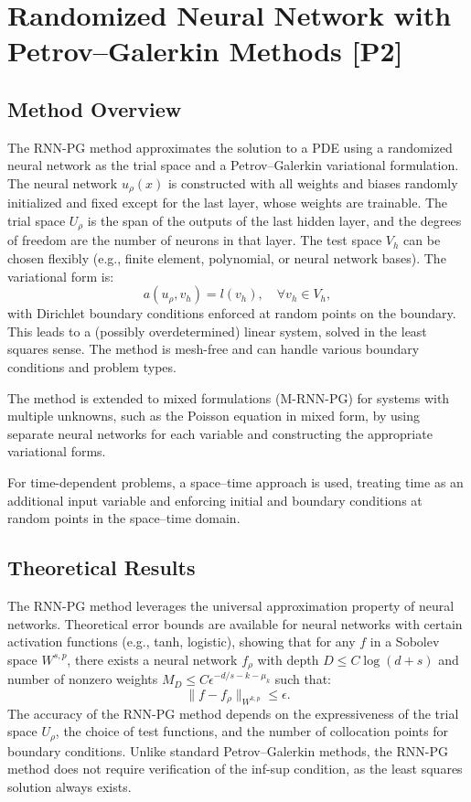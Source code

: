\documentclass[12pt]{article}
\begin{document}
\section{Randomized Neural Network with Petrov–Galerkin Methods [P2]}
\subsection{Method Overview}
The RNN-PG method approximates the solution to a PDE using a randomized neural network as the trial space and a Petrov–Galerkin variational formulation. The neural network $u_\rho(x)$ is constructed with all weights and biases randomly initialized and fixed except for the last layer, whose weights are trainable. The trial space $U_\rho$ is the span of the outputs of the last hidden layer, and the degrees of freedom are the number of neurons in that layer. The test space $V_h$ can be chosen flexibly (e.g., finite element, polynomial, or neural network bases). The variational form is:
\begin{equation}
    a(u_\rho, v_h) = l(v_h), \quad \forall v_h \in V_h,
\end{equation}
with Dirichlet boundary conditions enforced at random points on the boundary. This leads to a (possibly overdetermined) linear system, solved in the least squares sense. The method is mesh-free and can handle various boundary conditions and problem types.

The method is extended to mixed formulations (M-RNN-PG) for systems with multiple unknowns, such as the Poisson equation in mixed form, by using separate neural networks for each variable and constructing the appropriate variational forms.

For time-dependent problems, a space–time approach is used, treating time as an additional input variable and enforcing initial and boundary conditions at random points in the space–time domain.

\subsection{Theoretical Results}
The RNN-PG method leverages the universal approximation property of neural networks. Theoretical error bounds are available for neural networks with certain activation functions (e.g., tanh, logistic), showing that for any $f$ in a Sobolev space $W^{s,p}$, there exists a neural network $f_\rho$ with depth $D \leq C \log(d+s)$ and number of nonzero weights $M_D \leq C \epsilon^{-d/s-k-\mu_k}$ such that:
\begin{equation}
    \|f - f_\rho\|_{W^{k,p}} \leq \epsilon.
\end{equation}
The accuracy of the RNN-PG method depends on the expressiveness of the trial space $U_\rho$, the choice of test functions, and the number of collocation points for boundary conditions. Unlike standard Petrov–Galerkin methods, the RNN-PG method does not require verification of the inf-sup condition, as the least squares solution always exists.
\end{document}
